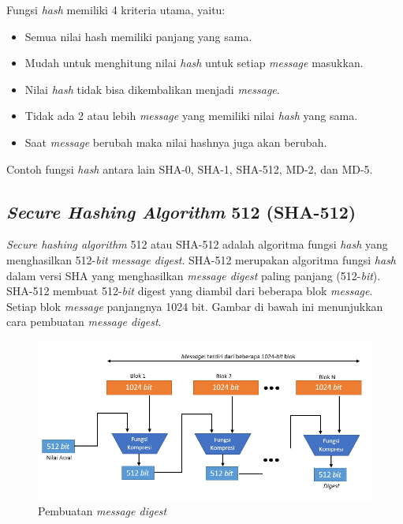 \noindent Fungsi \textit{hash} memiliki 4 kriteria utama, yaitu:
\begin{itemize}
	\item Semua nilai hash memiliki panjang yang sama.
	\item Mudah untuk menghitung nilai \textit{hash} untuk setiap \textit{message} masukkan.
	\item Nilai \textit{hash} tidak bisa dikembalikan menjadi \textit{message}.
	\item Tidak ada 2 atau lebih \textit{message} yang memiliki nilai \textit{hash} yang sama.
	\item Saat \textit{message} berubah maka nilai hashnya juga akan berubah.
\end{itemize}
Contoh fungsi \textit{hash} antara lain SHA-0, SHA-1, SHA-512, MD-2, dan MD-5.

\subsection{\textit{Secure Hashing Algorithm} 512 (SHA-512)}
\label{subsec:SHA512}
\textit{Secure hashing algorithm} 512 atau SHA-512 adalah algoritma fungsi \textit{hash} yang menghasilkan 512-\textit{bit} \textit{message digest}. SHA-512 merupakan algoritma fungsi \textit{hash} dalam versi SHA yang menghasilkan \textit{message digest} paling panjang (512-\textit{bit}). SHA-512 membuat 512-\textit{bit} digest yang diambil dari beberapa blok \textit{message}. Setiap blok \textit{message} panjangnya 1024 bit. Gambar di bawah ini menunjukkan cara pembuatan \textit{message digest}.

\begin{figure}[ht]
	\includegraphics[scale=0.8]{Gambar/digest_creation}
	\centering
	\caption{Pembuatan \textit{message digest}}
\end{figure}

